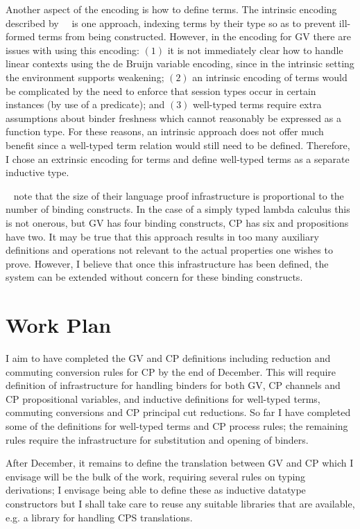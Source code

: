 \documentclass{mprop}
\newcommand{\1}{\textbf{1}\xspace}
\begin{document}
Another aspect of the encoding is how to define terms. The intrinsic encoding
described by~\citeauthor{Benton:2012:STT}~\cite{Benton:2012:STT} is one
approach, indexing terms by their type so as to prevent ill-formed terms from
being constructed. However, in the encoding for GV there are issues with using
this encoding: $(1)$ it is not immediately clear how to handle linear contexts
using the de Bruijn variable encoding, since in the intrinsic setting the
environment supports weakening; $(2)$ an intrinsic encoding of terms would be
complicated by the need to enforce that session types occur in certain
instances (by use of a predicate); and $(3)$ well-typed terms require extra
assumptions about binder freshness which cannot reasonably be expressed as a
function type. For these reasons, an intrinsic approach does not offer much
benefit since a well-typed term relation would still need to be
defined. Therefore, I chose an extrinsic encoding for terms and define
well-typed terms as a separate inductive type.

\citeauthor{Aydemir:2008:EFM}~\cite{Aydemir:2008:EFM} note that the size of
their language proof infrastructure is proportional to the number of binding
constructs. In the case of a simply typed lambda calculus this is not onerous,
but GV has four binding constructs, CP has six and propositions have two. It
may be true that this approach results in too many auxiliary definitions and
operations not relevant to the actual properties one wishes to prove. However,
I believe that once this infrastructure has been defined, the system can be
extended without concern for these binding constructs.

\section{Work Plan}

I aim to have completed the GV and CP definitions including reduction and
commuting conversion rules for CP by the end of December. This will require
definition of infrastructure for handling binders for both GV, CP channels and
CP propositional variables, and inductive definitions for well-typed terms,
commuting conversions and CP principal cut reductions. So far I have completed
some of the definitions for well-typed terms and CP process rules; the
remaining rules require the infrastructure for substitution and opening of
binders.

After December, it remains to define the translation between GV and CP which I
envisage will be the bulk of the work, requiring several rules on typing
derivations; I envisage being able to define these as inductive datatype
constructors but I shall take care to reuse any suitable libraries that are
available, e.g. a library for handling CPS translations.
\end{document}
